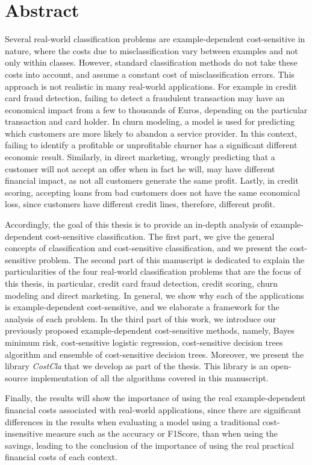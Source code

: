 \chapter*{Abstract}

Several real-world classification problems are example-dependent cost-sensitive in nature, where the 
costs due to misclassification vary between examples and not only within classes. However, standard 
classification methods do not take these costs into account, and assume a constant cost of 
misclassification errors. This approach is not realistic in many real-world applications. For  
example in credit card fraud detection, failing to detect a fraudulent transaction may have an 
economical impact from a few to thousands of Euros, depending on the particular transaction and card 
holder. In churn modeling, a model is used for predicting which customers are more likely to 
abandon a service provider. In this context, failing to identify a   profitable or unprofitable 
churner has a significant different economic   result. Similarly, in direct marketing, wrongly 
predicting that a customer   will not accept an offer when in fact he will, may have different 
financial impact, as not all   customers generate the same profit. Lastly, in credit scoring, 
accepting   loans from bad customers does not have the same economical loss, since customers have 
different   credit lines, therefore, different profit.

Accordingly, the goal of this thesis is to provide an in-depth analysis of example-dependent 
cost-sensitive classification. The first part, we give the  general concepts of classification 
and cost-sensitive classification, and we present the cost-sensitive problem. The second part of 
this manuscript is dedicated to explain the particularities of the four real-world classification 
problems that are the focus of this thesis, in particular, credit card fraud detection, credit 
scoring, churn modeling and direct marketing. In general, we show why each of the applications is 
example-dependent cost-sensitive, and we elaborate a framework for the analysis of each problem. In 
the third part of this work, we introduce our previously proposed example-dependent cost-sensitive 
methods, namely, Bayes minimum risk, cost-sensitive logistic regression, cost-sensitive decision 
trees algorithm and ensemble of cost-sensitive decision trees. Moreover, we present the library 
\mbox{\textit{CostCla}} that we develop as part of the thesis. This library is an open-source 
implementation of all the algorithms covered in this manuscript.

Finally, the results will show the importance of using the real example-dependent financial 
costs associated with real-world applications, since there are significant differences in the 
results when evaluating a model using a traditional cost-insensitive measure such as the accuracy 
or F1Score,  than when using the savings, leading to the conclusion of the importance of using the 
real practical financial costs of each context.
